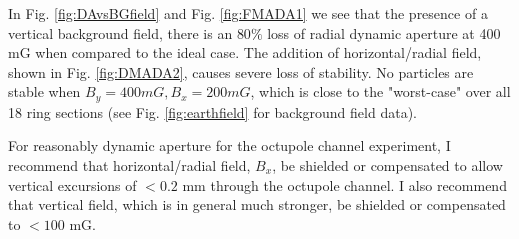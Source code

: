 \begin{figure}
\centering
{}
	\label{fig:FMADA1}
\hfill
{}
	\label{fig:FMADA2}
\end{figure}


In Fig. \ref{fig:DAvsBGfield} and Fig. \ref{fig:FMADA1} we see that the presence of a vertical background field, there is an $80\%$ loss of radial dynamic aperture at 400 mG when compared to the ideal case. The addition of horizontal/radial field, shown in Fig. \ref{fig:DMADA2}, causes severe loss of stability. No particles are stable when $B_y=400 mG, B_x=200 mG$, which is close to the "worst-case" over all 18 ring sections (see Fig. \ref{fig:earthfield} for background field data). 

For reasonably dynamic aperture for the octupole channel experiment, I recommend that horizontal/radial field, $B_x$, be shielded or compensated to allow vertical excursions of $<0.2$ mm through the octupole channel. I also recommend that vertical field, which is in general much stronger, be shielded or compensated to $< 100$ mG. 

